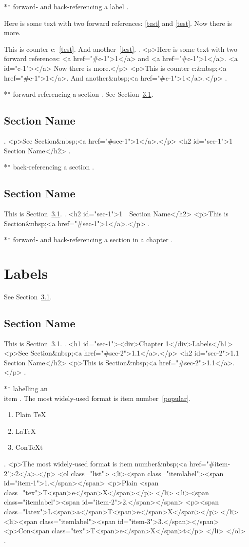 ** forward- and back-referencing a label
.

Here is some text with two forward references: \ref{test} and \ref{test}.
Now there is more.

This \label{test} is counter c:~\ref{test}. And another~\ref{test}.
.
<p>Here is some text with two forward references: <a href="#c-1">1</a> and <a href="#c-1">1</a>. <a id="c-1"></a> Now there is more.</p>
<p>This  is counter c:&nbsp;<a href="#c-1">1</a>. And another&nbsp;<a href="#c-1">1</a>.</p>
.


** forward-referencing a section
.
See Section~\ref{sec:test}.

\section{Section Name}
\label{sec:test}
.
<p>See Section&nbsp;<a href="#sec-1">1</a>.</p>
<h2 id="sec-1">1 Section Name</h2>
.


** back-referencing a section
.
\section{Section Name}

This \label{sec:test} is Section~\ref{sec:test}.
.
<h2 id="sec-1">1 Section Name</h2>
<p>This  is Section&nbsp;<a href="#sec-1">1</a>.</p>
.


** forward- and back-referencing a section in a chapter
.
\chapter{Labels}

See Section~\ref{sec:test}.

\section{Section Name}
\label{sec:test}
This is Section~\ref{sec:test}.
.
<h1 id="sec-1"><div>Chapter 1</div>Labels</h1>
<p>See Section&nbsp;<a href="#sec-2">1.1</a>.</p>
<h2 id="sec-2">1.1 Section Name</h2>
<p>This is Section&nbsp;<a href="#sec-2">1.1</a>.</p>
.


** labelling an \\item
.
The most widely-used format is item number~\ref{popular}.
\begin{enumerate}
    \item Plain \TeX
    \item \label{popular} \LaTeX
    \item Con\TeX t
\end{enumerate}
.
<p>The most widely‐used format is item number&nbsp;<a href="#item-2">2</a>.</p>
<ol class="list">
<li><span class="itemlabel"><span id="item-1">1.</span></span>
<p>Plain <span class="tex">T<span>e</span>X</span></p>
</li>
<li><span class="itemlabel"><span id="item-2">2.</span></span>
<p><span class="latex">L<span>a</span>T<span>e</span>X</span></p>
</li>
<li><span class="itemlabel"><span id="item-3">3.</span></span>
<p>Con<span class="tex">T<span>e</span>X</span>t</p>
</li>
</ol>
.



